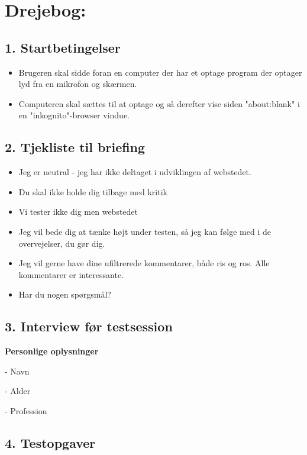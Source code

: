\documentclass[12pt,a4paper,oneside]{article}
\author{Bertram A. Nicolas, Christian Enevoldsen}
\begin{document}
\section*{Drejebog:}

\subsection{1. Startbetingelser}
\begin{itemize}
\item{Brugeren skal sidde foran en computer der har et optage program der optager lyd fra en mikrofon og skærmen.
}
\item{Computeren skal sættes til at optage og så derefter vise siden "about:blank" i en "inkognito"-browser vindue.
}

\end{itemize}

\subsection{2. Tjekliste til briefing}

\begin{itemize}
\item{Jeg er neutral - jeg har ikke deltaget i udviklingen af webstedet.}

\item{Du skal ikke holde dig tilbage med kritik}
\item{Vi tester ikke dig men webstedet}
\item{Jeg vil bede dig at tænke højt under testen, så jeg kan følge med i de overvejelser, du gør dig.}
\item{Jeg vil gerne have dine ufiltrerede kommentarer, både ris og ros. Alle kommentarer er interessante.}
\item{Har du nogen spørgsmål?}
\end{itemize}

\subsection{3. Interview før testsession}

\textbf{Personlige oplysninger}

- Navn

- Alder

- Profession


\subsection{4. Testopgaver}
\end{document}
